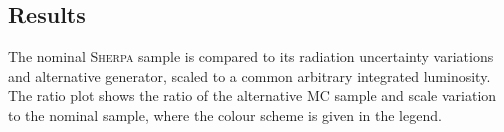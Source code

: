 \subsection{Results}
The nominal  \textsc{Sherpa} \ttW  sample is compared to its radiation uncertainty variations and alternative generator, scaled to a common arbitrary integrated luminosity.
The ratio plot shows the ratio of the alternative MC sample and scale variation to the nominal sample, where the colour scheme is given in the legend.



